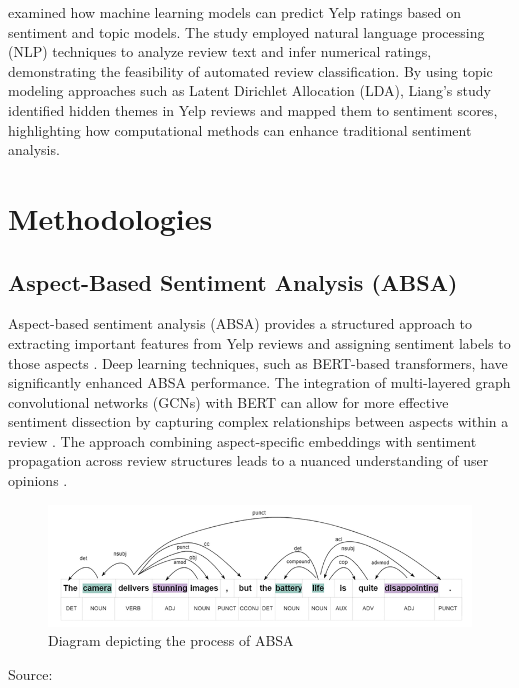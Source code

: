\documentclass{article}
\begin{document}
\cite{Liang2018} examined how machine learning models can predict Yelp ratings based on sentiment and topic models. The study employed natural language processing (NLP) techniques to analyze review text and infer numerical ratings, demonstrating the feasibility of automated review classification. By using topic modeling approaches such as Latent Dirichlet Allocation (LDA), Liang’s study identified hidden themes in Yelp reviews and mapped them to sentiment scores, highlighting how computational methods can enhance traditional sentiment analysis.

\section{Methodologies}

\subsection{Aspect-Based Sentiment Analysis (ABSA)}
Aspect-based sentiment analysis (ABSA) provides a structured approach to extracting important features from Yelp reviews and assigning sentiment labels to those aspects \citep{HuLiu2004}. Deep learning techniques, such as BERT-based transformers, have significantly enhanced ABSA performance. The integration of multi-layered graph convolutional networks (GCNs) with BERT can allow for more effective sentiment dissection by capturing complex relationships between aspects within a review \citep{Aziz2024}. The approach combining aspect-specific embeddings with sentiment propagation across review structures leads to a nuanced understanding of user opinions \citep{Aziz2024}.

\begin{figure}[h]
    \centering
    \includegraphics[width=1.0\textwidth]{absa.png} %
    \caption{Diagram depicting the process of ABSA}
    \label{fig:myimage}
\end{figure}
\begin{center}
Source: \cite{Aziz2024}
\end{center}
\end{document}

